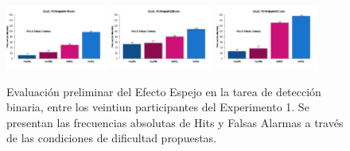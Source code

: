 \documentclass[a4paper ]{article}
\begin{document}
\begin{figure}[th]
\includegraphics[width=0.3\textwidth]{Figures/MirrorRate_Exp2_P19} \includegraphics[width=0.3\textwidth]{Figures/MirrorRate_Exp2_P20} \includegraphics[width=0.3\textwidth]{Figures/MirrorRate_Exp2_P21} 
\caption[Hits y Falsas Alarmas entre condiciones; Experimento 2]{Evaluación preliminar del Efecto Espejo en la tarea de detección binaria, entre los veintiun participantes del Experimento 1. Se presentan las frecuencias absolutas de Hits y Falsas Alarmas a través de las condiciones de dificultad propuestas.}
\label{fig:MRate_E2}
\end{figure}
\end{document}
